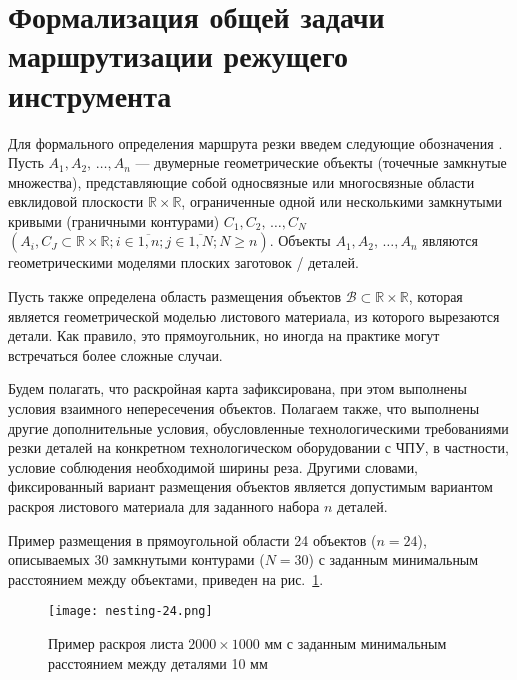 
\section{Формализация общей задачи маршрутизации режущего инструмента}
\label{sec:cut.stmt}

Для формального определения маршрута резки введем следующие обозначения
\cite{bi:book2020,bib:petunin-2019}.
Пусть
$A_1, A_2, \,\dots, A_n$
--- двумерные геометрические объекты
(точечные замкнутые множества),
представляющие собой односвязные или
многосвязные области евклидовой плоскости
$\mathbb R \times \mathbb R$,
ограниченные одной или несколькими замкнутыми кривыми
(граничными контурами)
$C_1, C_2, \,\dots, C_N$
$(A_i, C_J \subset \mathbb R \times \mathbb R;
i \in \overline{1,n};
j \in \overline{1, N};
N \geqslant n)$.
Объекты
$A_1, A_2, \,\dots, A_n$
являются геометрическими моделями плоских заготовок / деталей.

Пусть также определена область размещения объектов
$\mathcal B \subset \mathbb R \times \mathbb R$,
которая является геометрической моделью листового материала,
из которого вырезаются детали.
Как правило, это прямоугольник,
но иногда на практике могут встречаться
более сложные случаи.

Будем полагать, что раскройная карта зафиксирована,
при этом выполнены условия взаимного непересечения объектов.
Полагаем также, что выполнены другие дополнительные условия,
обусловленные технологическими требованиями резки деталей
на конкретном технологическом оборудовании с ЧПУ,
в частности, условие соблюдения необходимой ширины реза.
Другими словами, фиксированный вариант размещения объектов
является допустимым вариантом раскроя листового материала
для заданного набора $n$ деталей.

Пример размещения в прямоугольной области 24 объектов
($n=24$),
описываемых 30 замкнутыми контурами
($N=30$)
с заданным минимальным расстоянием между объектами,
приведен на рис.~\ref{fig:cut.nesting}.

\begin{figure}
  \centering
  \texttt{[image: nesting-24.png]}
  \caption{
    Пример раскроя листа $2000 \times 1000$ мм
    с заданным минимальным расстоянием между деталями 10 мм
  }
  \label{fig:cut.nesting}
\end{figure}


